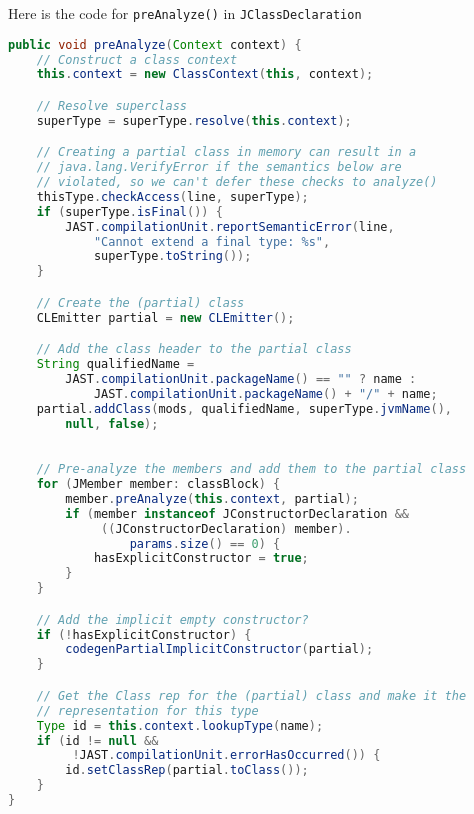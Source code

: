 \documentclass[8pt,a4paper,compress]{beamer}
\begin{document}
\begin{frame}[fragile]
\pause

Here is the code for \lstinline{preAnalyze()} in \lstinline{JClassDeclaration}
\begin{lstlisting}[language=Java]
public void preAnalyze(Context context) {
    // Construct a class context
    this.context = new ClassContext(this, context);

    // Resolve superclass
    superType = superType.resolve(this.context);

    // Creating a partial class in memory can result in a
    // java.lang.VerifyError if the semantics below are
    // violated, so we can't defer these checks to analyze()
    thisType.checkAccess(line, superType);
    if (superType.isFinal()) {
        JAST.compilationUnit.reportSemanticError(line,
            "Cannot extend a final type: %s",                                   
            superType.toString());
    }

    // Create the (partial) class
    CLEmitter partial = new CLEmitter();

    // Add the class header to the partial class
    String qualifiedName =
        JAST.compilationUnit.packageName() == "" ? name :
            JAST.compilationUnit.packageName() + "/" + name;
    partial.addClass(mods, qualifiedName, superType.jvmName(),
        null, false);
\end{lstlisting}
\end{frame}

\begin{frame}[fragile]
\pause

\begin{lstlisting}[language=Java]

    // Pre-analyze the members and add them to the partial class
    for (JMember member: classBlock) {
        member.preAnalyze(this.context, partial);
        if (member instanceof JConstructorDeclaration &&
             ((JConstructorDeclaration) member).
                 params.size() == 0) {
            hasExplicitConstructor = true;
        }
    }

    // Add the implicit empty constructor?
    if (!hasExplicitConstructor) {
        codegenPartialImplicitConstructor(partial);
    }

    // Get the Class rep for the (partial) class and make it the
    // representation for this type
    Type id = this.context.lookupType(name);
    if (id != null &&
         !JAST.compilationUnit.errorHasOccurred()) {
        id.setClassRep(partial.toClass());
    }
}
\end{lstlisting}
\end{frame}
\end{document}
